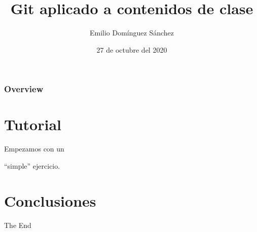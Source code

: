 \documentclass{beamer}
\title{Git aplicado a contenidos de clase} %
\author{Emilio Domínguez Sánchez} %
\institute[UM] %
{
University of Murcia \\ %
\medskip
\textit{emilio.dominguezs@um.es} %
}
\date{27 de octubre del 2020} %
\begin{document}
\begin{frame}
\titlepage
\end{frame}

\begin{frame}
\frametitle{Overview}
\tableofcontents
\end{frame}



\section{Tutorial}

\begin{frame}
\begin{center}
    \Huge
    Empezamos con un

    ``simple'' ejercicio.
\end{center}
\end{frame}







\section*{Conclusiones}

\begin{frame}
\begin{center}
    \Huge
    The End
\end{center}
\end{frame}

\end{document}
